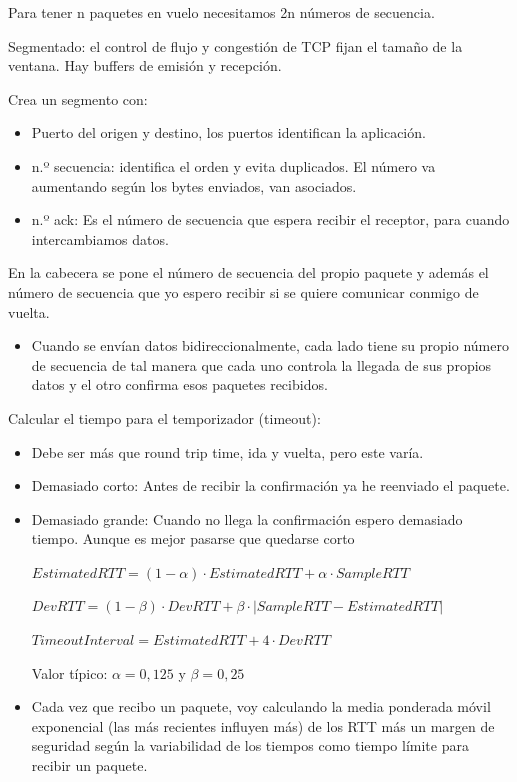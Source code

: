 \documentclass[12pt, twoside, openright]{report} %
\begin{document}
Para tener n paquetes en vuelo necesitamos 2n números de secuencia.

Segmentado: el control de flujo y congestión de TCP fijan el tamaño
de la ventana. Hay buffers de emisión y recepción.

Crea un segmento con:

\begin{itemize}
	\item Puerto del origen y destino, los puertos identifican la
	      aplicación.
	\item n.º secuencia: identifica el orden y evita duplicados. El número va
	      aumentando según los bytes enviados, van asociados.
	\item n.º ack: Es el número de secuencia que espera recibir el receptor,
	      para cuando intercambiamos datos.
\end{itemize}
\begin{figure}[H]
	{\def\svgwidth{1.2\textwidth}
		}
\end{figure}
\pagebreak
En la cabecera se pone el número de secuencia del propio paquete y
además el número de secuencia que yo espero recibir si se quiere
comunicar conmigo de vuelta.

\begin{itemize}
	\item Cuando se envían datos bidireccionalmente, cada lado tiene su
	      propio número de secuencia de tal manera que cada uno controla la
	      llegada de sus propios datos y el otro confirma esos paquetes
	      recibidos.
\end{itemize}

Calcular el tiempo para el temporizador (timeout):

\begin{itemize}
	\item Debe ser más que round trip time, ida y vuelta, pero este varía.
	\item Demasiado corto: Antes de recibir la confirmación ya he reenviado
	      el paquete.
	\item Demasiado grande: Cuando no llega la confirmación espero demasiado
	      tiempo. Aunque es mejor pasarse que quedarse corto

	      $\textit{EstimatedRTT}=(1-\alpha)\cdot \textit{EstimatedRTT} + \alpha \cdot \textit{SampleRTT}$

	      $\textit{DevRTT} = (1-\beta)\cdot \textit{DevRTT} + \beta \cdot |\textit{SampleRTT}-\textit{EstimatedRTT}|$

	      $\textit{TimeoutInterval} = \textit{EstimatedRTT} + 4 \cdot \textit{DevRTT}$

	      Valor típico: $\alpha = 0,125$ y $\beta = 0,25$
	\item Cada vez que recibo un paquete, voy calculando la media ponderada
	      móvil exponencial (las más recientes influyen más) de los RTT más
	      un margen de seguridad según la variabilidad de los tiempos como
	      tiempo límite para recibir un paquete.
\end{itemize}
\end{document}
